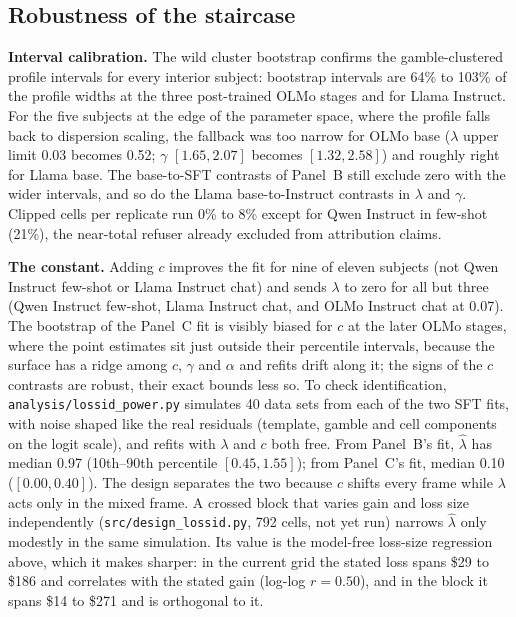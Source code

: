 \documentclass[11pt]{article}
\begin{document}
\subsection{Robustness of the staircase}\label{sec:robust}

\textbf{Interval calibration.} The wild cluster bootstrap confirms the gamble-clustered profile
intervals for every interior subject: bootstrap intervals are 64\% to 103\% of the profile widths at the
three post-trained OLMo stages and for Llama Instruct. For the five subjects at the edge of the
parameter space, where the profile falls back to dispersion scaling, the fallback was too narrow for OLMo
base ($\lambda$ upper limit 0.03 becomes 0.52; $\gamma$ $[1.65, 2.07]$ becomes $[1.32, 2.58]$) and
roughly right for Llama base. The base-to-SFT contrasts of Panel~B still exclude zero with the wider
intervals, and so do the Llama base-to-Instruct contrasts in $\lambda$ and $\gamma$. Clipped cells per
replicate run 0\% to 8\% except for Qwen Instruct in few-shot (21\%), the near-total refuser already
excluded from attribution claims.

\textbf{The constant.} Adding $c$ improves the fit for nine of eleven subjects (not Qwen Instruct
few-shot or Llama Instruct chat) and sends $\lambda$ to zero for all but three (Qwen Instruct few-shot,
Llama Instruct chat, and OLMo Instruct chat at 0.07). The bootstrap of the Panel~C fit is visibly biased
for $c$ at the later OLMo stages, where the point estimates sit just outside their percentile intervals,
because the surface has a ridge among $c$, $\gamma$ and $\alpha$ and refits drift along it; the signs of the
$c$ contrasts are robust, their exact bounds less so. To check identification,
\texttt{analysis/lossid\_power.py} simulates 40 data sets from each of the two SFT fits, with noise
shaped like the real residuals (template, gamble and cell components on the logit scale), and refits with
$\lambda$ and $c$ both free. From Panel~B's fit, $\hat\lambda$ has median 0.97 (10th--90th percentile
$[0.45, 1.55]$); from Panel~C's fit, median 0.10 ($[0.00, 0.40]$). The design separates the two because
$c$ shifts every frame while $\lambda$ acts only in the mixed frame. A crossed block that varies gain and
loss size independently (\texttt{src/design\_lossid.py}, 792 cells, not yet run) narrows $\hat\lambda$
only modestly in the same simulation. Its value is the model-free loss-size regression above, which it
makes sharper: in the current grid the stated loss spans \$29 to \$186 and correlates with the stated
gain (log-log $r = 0.50$), and in the block it spans \$14 to \$271 and is orthogonal to it.
\end{document}
